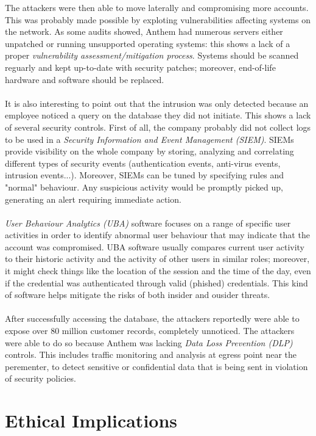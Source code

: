 \documentclass[12pt]{extarticle}
\begin{document}
	The attackers were then able to move laterally and compromising more accounts. This was probably made possible by exploting vulnerabilities affecting systems on the network. As some audits\cite{anthemAuditReport} showed, Anthem had numerous servers either unpatched or running unsupported operating systems: this shows a lack of a proper \textit{vulnerability assessment/mitigation process}. Systems should be scanned reguarly and kept up-to-date with security patches; moreover, end-of-life hardware and software should be replaced.\\\\ %
	It is also interesting to point out that the intrusion was only detected because an employee noticed a query on the database they did not initiate. This shows a lack of several security controls. First of all, the company probably did not collect logs to be used in a \textit{Security Information and Event Management (SIEM)}. SIEMs provide visibility on the whole company by storing, analyzing and correlating different types of security events (authentication events, anti-virus events, intrusion events...). Moreover, SIEMs can be tuned by specifying rules and "normal" behaviour. Any suspicious activity would be promptly picked up, generating an alert requiring immediate action. \\\\
	\textit{User Behaviour Analytics (UBA)} software focuses on a range of specific user activities \cite{uba} in order to identify abnormal user behaviour that may indicate that the account was compromised. UBA software usually compares current user activity to their historic activity and the activity of other users in similar roles; moreover, it might check things like the location of the session and the time of the day, even if the credential was authenticated through valid (phished) credentials. This kind of software helps mitigate the risks of both insider and ousider threats.\\\\
	After successfully accessing the database, the attackers reportedly were able to expose over 80 million customer records, completely unnoticed. The attackers were able to do so because Anthem was lacking \textit{Data Loss Prevention (DLP)} controls. This includes traffic monitoring and analysis at egress point near the perementer, to detect sensitive or confidential data that is being sent in violation of security policies.
	\newpage
	\section{Ethical Implications}
	
	
	
	 
	\newpage
	\printbibliography
\end{document}
